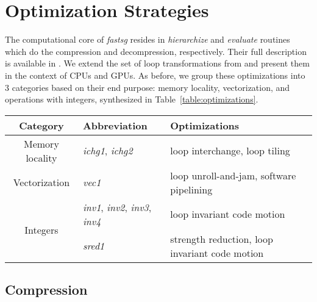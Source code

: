 \section{Optimization Strategies}
\label{sec:op_strategies}

The computational core of \textit{fastsg} resides in \textit{hierarchize} and
\textit{evaluate} routines which do the compression and decompression,
respectively. Their full description is available in
\cite{Murarasu:2011:CDS:1941553.1941559}. We extend the set of loop
transformations from \cite{murarasu12fastsg:} and present them in the context of
CPUs and GPUs. As before, we group these optimizations into 3 categories based
on their end purpose: memory locality, vectorization, and operations with
integers, synthesized in Table~\ref{table:optimizations}.

\begin{table*}[t]
\caption{Summary of optimizations.}
\label{table:optimizations}
\centering
\small
\begin{tabular}{|c|l|l|}
  \hline
  \textbf{Category} & \textbf{Abbreviation} & \textbf{Optimizations} \\ 
  \hline
  Memory locality & \textit{ichg1}, \textit{ichg2} & loop interchange, loop tiling \\ 
  \hline
  Vectorization  & \textit{vec1} & loop unroll-and-jam, software pipelining \\ 
  \hline
  \multirow{2}{*}{Integers} & \textit{inv1}, \textit{inv2}, \textit{inv3}, \textit{inv4} & loop invariant code motion \\
  \cline{2-3}
  & \textit{sred1} & strength reduction, loop invariant code motion \\
  \hline
\end{tabular}
\end{table*}

\subsection{Compression}

